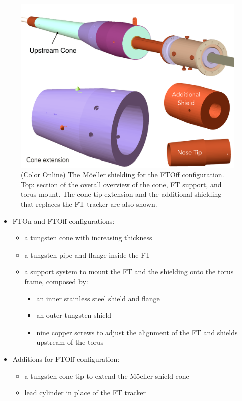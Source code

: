 \begin{figure}
	\centering
	\includegraphics[width=0.99\columnwidth,keepaspectratio]{img/moellerShieldingFTOff.png}
   \caption{(Color Online) The M\"oeller shielding for the FTOff configuration. Top: section of the overall overview of the cone, FT support, and torus mount.
            The cone tip extension and the additional shielding that replaces the FT tracker are also shown.}
	\label{fig:moellerShieldingFTOff}
\end{figure}



\begin{itemize}
	\item FTOn and FTOff configurations:
	\begin{itemize}
		\item a tungsten cone with increasing thickness
		\item a tungsten pipe and flange inside the FT
		\item a support system to mount the FT and the shielding onto the torus frame, composed by:
		\begin{itemize}
			\item an inner stainless steel shield and flange
			\item an outer tungsten shield
			\item nine copper screws to adjust the alignment of the FT and shields upstream of the torus
		\end{itemize}
	\end{itemize}
	\item Additions for FTOff configuration:
	\begin{itemize}
	\item a tungsten cone tip to extend the M\"oeller shield cone
	\item lead cylinder in place of the FT tracker
	\end{itemize}

\end{itemize}





